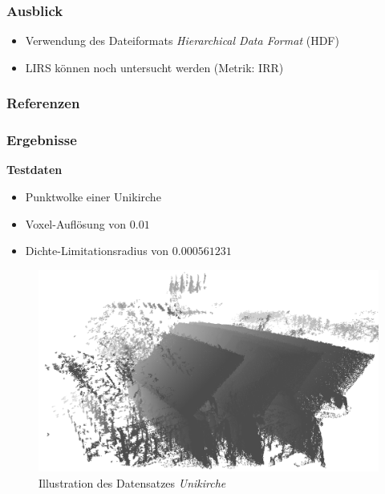 \documentclass[presentation]{beamer}
\begin{document}
 
\begin{frame}
	\frametitle{Ausblick}
	\begin{itemize}
		\item Verwendung des Dateiformats \emph{Hierarchical Data Format} (HDF)
		\item LIRS können noch untersucht werden (Metrik: IRR) %
	\end{itemize}
\end{frame}

\nocite{podlipnig2003survey}
\nocite{karedla1994caching}
\nocite{cherkasova1998improving} 

\begin{frame}  %
	\frametitle{Referenzen}
	\printbibliography[heading=none]
\end{frame}
 
\begin{frame}
\frametitle{Ergebnisse}
\baselineskip
\color{dd-gray} \textbf{Testdaten} \color{black}


\begin{itemize}
	\item Punktwolke einer Unikirche
	\item Voxel-Auflösung von $0.01$
	\item Dichte-Limitationsradius von $0.000561231$ 
\end{itemize}

\begin{figure}
	\centering
	\includegraphics[width=0.55\linewidth]{figures/Unikirche2.png}
	\caption{Illustration des Datensatzes \emph{Unikirche}}
	\label{fig:sub11}
\end{figure}
\end{frame}
\end{document}
